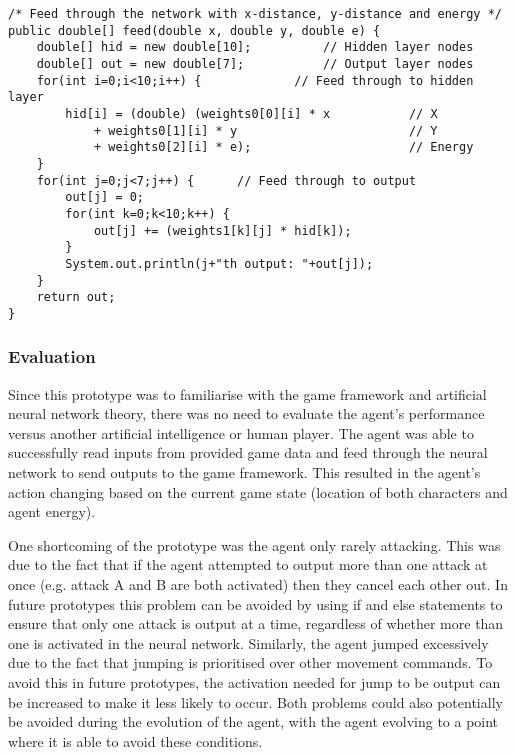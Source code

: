 \documentclass[12pt,a4paper]{article}
\begin{document}
\vspace{6mm}

\begin{lstlisting}
/* Feed through the network with x-distance, y-distance and energy */
public double[] feed(double x, double y, double e) {
	double[] hid = new double[10];			// Hidden layer nodes
	double[] out = new double[7];			// Output layer nodes
	for(int i=0;i<10;i++) {				// Feed through to hidden layer
		hid[i] = (double) (weights0[0][i] * x			// X
			+ weights0[1][i] * y						// Y
			+ weights0[2][i] * e);						// Energy
	}
	for(int j=0;j<7;j++) {		// Feed through to output
		out[j] = 0;
		for(int k=0;k<10;k++) {
			out[j] += (weights1[k][j] * hid[k]);
		}
		System.out.println(j+"th output: "+out[j]);
	}
	return out;
}
\end{lstlisting}

\newpage
\subsubsection{Evaluation}
Since this prototype was to familiarise with the game framework and artificial neural network theory, there was no need to evaluate the agent's performance versus another artificial intelligence or human player. The agent was able to successfully read inputs from provided game data and feed through the neural network to send outputs to the game framework. This resulted in the agent's action changing based on the current game state (location of both characters and agent energy). 

One shortcoming of the prototype was the agent only rarely attacking. This was due to the fact that if the agent attempted to output more than one attack at once (e.g. attack A and B are both activated) then they cancel each other out. In future prototypes this problem can be avoided by using if and else statements to ensure that only one attack is output at a time, regardless of whether more than one is activated in the neural network. Similarly, the agent jumped excessively due to the fact that jumping is prioritised over other movement commands. To avoid this in future prototypes, the activation needed for jump to be output can be increased to make it less likely to occur. Both problems could also potentially be avoided during the evolution of the agent, with the agent evolving to a point where it is able to avoid these conditions.
\end{document}
